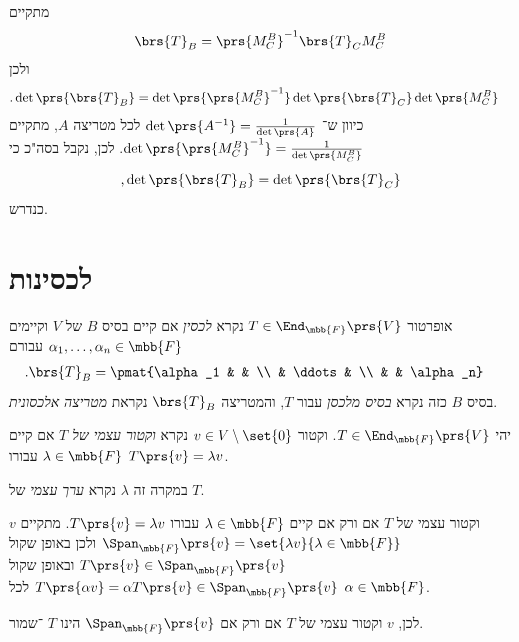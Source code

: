 \documentclass[a4paper,10pt,twoside,openany]{book}
\begin{document}
\begin{solution}
מתקיים
\begin{align*}
\brs{T}_B = \prs{M^B_C}^{-1} \brs{T}_C M^B_C
\end{align*}
ולכן
\begin{align*}
\text{.} \det\prs{\brs{T}_B} &= \det\prs{\prs{M^B_C}^{-1}} \det\prs{\brs{T}_C} \det\prs{M^B_C}
\end{align*}
כיוון ש־%
$\det\prs{A^{-1}} = \frac{1}{\det\prs{A}}$
 לכל מטריצה
 $A$,
 מתקיים
 $\det\prs{\prs{M^B_C}^{-1}} = \frac{1}{\det\prs{M^B_C}}$.
 לכן, נקבל בסה"כ כי
 \[\text{,} \det\prs{\brs{T}_B} = \det\prs{\brs{T}_C}\]
 כנדרש.
\end{solution}

\section{לכסינות}

\begin{definition}
אופרטור
$T \in \End_{\mbb{F}}\prs{V}$
נקרא
\emph{לכסין}
אם קיים בסיס
$B$
של
$V$
וקיימים
$\alpha_1, \ldots, \alpha_n \in \mbb{F}$
עבורם
\begin{align*}
\text{.} \brs{T}_B &= \pmat{\alpha_1 & & \\ & \ddots &  \\  &  & \alpha_n}
\end{align*}
בסיס
$B$
כזה נקרא
\emph{בסיס מלכסן}
עבור
$T$,
והמטריצה
$\brs{T}_B$
נקראת
\emph{מטריצה אלכסונית}.
\end{definition}

\begin{definition}
יהי
$T \in \End_{\mbb{F}}\prs{V}$.
וקטור
$v \in V \setminus \set{0}$
נקרא
\emph{וקטור עצמי של
$T$}
אם קיים
$\lambda \in \mbb{F}$
עבורו
$T\prs{v} = \lambda v$.

במקרה זה
$\lambda$
נקרא
\emph{ערך עצמי}
של
$T$.
\end{definition}

\begin{remark}
$v$
וקטור עצמי של
$T$
אם ורק אם קיים
$\lambda \in \mbb{F}$
עבורו
$T\prs{v} = \lambda v$.
מתקיים
$\Span_{\mbb{F}}\prs{v} = \set{\lambda v}{\lambda \in \mbb{F}}$
ולכן באופן שקול
$T\prs{v} \in \Span_{\mbb{F}}\prs{v}$
ובאופן שקול
$T\prs{\alpha v} = \alpha T\prs{v} \in \Span_{\mbb{F}}\prs{v}$
לכל
$\alpha \in \mbb{F}$.

לכן,
$v$
וקטור עצמי של
$T$
אם ורק אם
$\Span_{\mbb{F}}\prs{v}$
הינו
$T$%
־שמור.
\end{remark}
\end{document}
